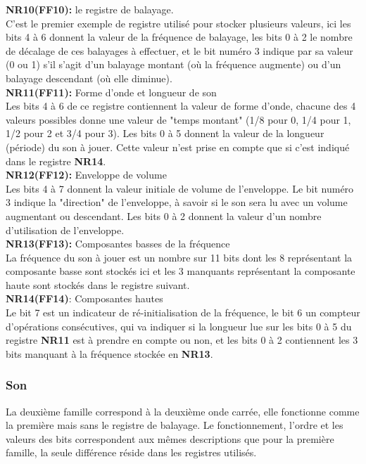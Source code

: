 \documentclass{report}
\begin{document}
	\textbf{NR10(FF10):} le registre de balayage.\\
		C'est le premier exemple de registre utilisé pour
		stocker plusieurs valeurs, ici les bits 4 à 6 donnent
		la valeur de la fréquence de balayage, les bits 0 à 2
		le nombre de décalage de ces balayages à effectuer, et le bit
		numéro 3 indique par sa valeur (0 ou 1) s'il s'agit
		d'un balayage montant (où la fréquence augmente) ou
		d'un balayage descendant (où elle diminue).\\ 
	
	\textbf{NR11(FF11):} Forme d'onde et longueur de son\\
		Les bits 4 à 6 de ce registre contiennent la valeur de
		forme d'onde, chacune des 4 valeurs possibles donne
		une valeur de "temps montant" (1/8 pour 0, 1/4 pour
		1, 1/2 pour 2 et 3/4 pour 3).
		Les bits 0 à 5 donnent la valeur de la longueur
		(période) du son à jouer. Cette valeur n'est prise en
		compte que si c'est indiqué dans le registre \textbf{NR14}.\\
	
	\textbf{NR12(FF12):} Enveloppe de volume \\
		Les bits 4 à 7 donnent la valeur initiale de volume de
		l'enveloppe.
		Le bit numéro 3 indique la "direction" de l'enveloppe,
		à savoir si le son sera lu avec un volume augmentant
		ou descendant.
		Les bits 0 à 2 donnent la valeur d'un nombre
		d'utilisation de l'enveloppe.\\ 
	
	\textbf{NR13(FF13):} Composantes basses de la fréquence \\
		La fréquence du son à jouer est un nombre sur 11 bits
		dont les 8 représentant la composante basse sont
		stockés ici et les 3 manquants représentant la
		composante haute sont stockés dans le registre
		suivant.\\ 

	\textbf{NR14(FF14)}: Composantes hautes \\
		Le bit 7 est un indicateur de ré-initialisation de la
		fréquence, le bit 6 un compteur d'opérations
		consécutives, qui va indiquer si la longueur lue sur
		les bits 0 à 5 du registre \textbf{NR11} est à prendre en
		compte ou non, et les bits 0 à 2 contiennent les 3 bits
		manquant à la fréquence stockée en \textbf{NR13}.
	\subsubsection{Son}
		La deuxième famille correspond à la deuxième onde carrée, elle
		fonctionne comme la première mais sans le registre de
		balayage. Le fonctionnement, l'ordre et les valeurs des bits
		correspondent aux mêmes descriptions que pour la première
		famille, la seule différence réside dans les registres
		utilisés.\\ \\
	
\end{document}
